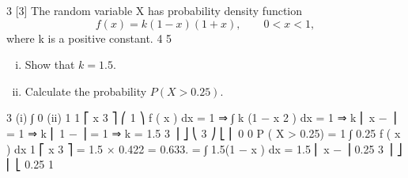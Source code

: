 \documentclass[a4paper,12pt]{article}
\begin{document}
3
[3]
The random variable X has probability density function
\[f ( x ) = k (1 − x )(1 + x ),
\qquad 0 < x < 1 ,\]
where k is a positive constant.
4
5
\begin{enumerate}[(i)]
\item Show that $k = 1.5$.
\item Calculate the probability $P(X > 0.25)$.
\end{enumerate}

3
(i)
∫
0
(ii)
1
1
⎡
x 3 ⎤
⎛ 1 ⎞
f ( x ) dx = 1 ⇒ ∫ k (1 − x 2 ) dx = 1 ⇒ k ⎢ x − ⎥ = 1 ⇒ k ⎜ 1 − ⎟ = 1 ⇒ k = 1.5
3 ⎥ ⎦
⎝ 3 ⎠
⎣ ⎢
0
0
P ( X > 0.25) =
1
∫ 0.25 f ( x ) dx
1
⎡
x 3 ⎤
= 1.5 × 0.422 = 0.633.
= ∫ 1.5(1 − x ) dx = 1.5 ⎢ x − ⎥
0.25
3 ⎥ ⎦
⎢ ⎣
0.25
1
\end{document}
